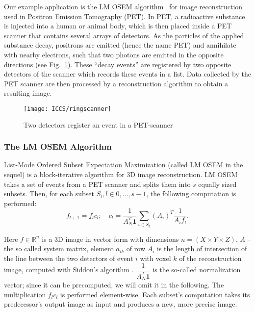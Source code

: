 Our example application is the LM OSEM algorithm~\cite{ReaderErFlOt1998, SchellmannGoMeKoScWuBu2009} for image reconstruction used in Positron Emission Tomography (PET).
In PET, a radioactive substance is injected into a human or animal body, which is then placed inside a PET scanner that contains several arrays of detectors.
As the particles of the applied substance decay, positrons are emitted (hence the name PET) and annihilate with nearby electrons, such that two photons are emitted in the opposite directions (see Fig.~\ref{fig:scanner and detector}).
These ``decay events'' are registered by two opposite detectors of the scanner which records these events in a list.
Data collected by the PET scanner are then processed by a reconstruction algorithm to obtain a resulting image.

\begin{figure}
  \centering
  \texttt{[image: ICCS/ringscanner]}
  \caption{Two detectors register an event in a PET-scanner}
  \label{fig:scanner and detector}
\end{figure}

\subsubsection{The LM OSEM Algorithm}
List-Mode Ordered Subset Expectation Maximization \cite{ReaderErFlOt1998} (called LM OSEM in the sequel) is a block-iterative algorithm for 3D image reconstruction.
LM OSEM takes a set of events from a PET scanner and splits them into $s$ equally sized subsets.
Then, for each subset $S_l, l \in {0, \ldots, s-1}$, the following computation is performed:
\begin{equation}
  f_{l+1}=f_{l}c_{l};\quad c_{l}=\dfrac{1}{A_N^T \textbf{1}} \sum_{i \in S_{l}} (A_i)^T \dfrac{1}{A_{i} f_{l}}.
\label{equ:lm_osem}
\end{equation}

Here $f \in \mathbb{R}^n$ is a 3D image in vector form with dimensions $n = (X \times Y \times Z)$, $A$ -- the so called system matrix, element $a_{ik}$ of row $A_i$ is the length of intersection of the line between the two detectors of event $i$ with voxel $k$ of the reconstruction image, computed with Siddon's algorithm \cite{Siddon1985}.
$\dfrac{1}{A_N^T \textbf{1}}$ is the so-called normalization vector; since it can be precomputed, we will omit it in the following.
The multiplication $f_{l}c_{l}$ is performed element-wise.
Each subset's computation takes its predecessor's output image as input and produces a new, more precise image.

